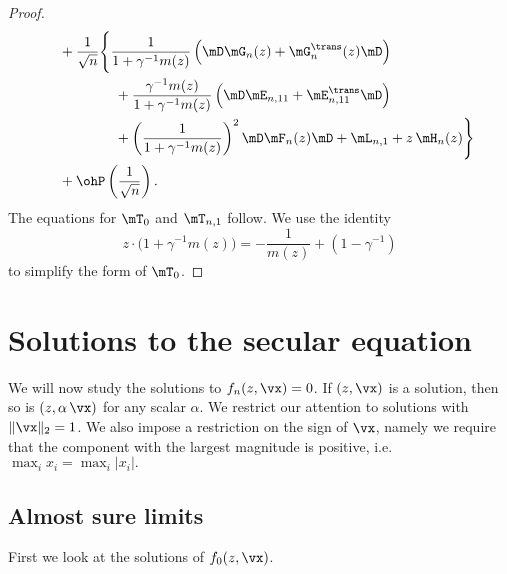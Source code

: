 \begin{proof}
\[\begin{split}
                &\quad+
                \frac{1}{\sqrt{n}} \Bigg\{
                    \frac{1}{1 + \gamma^{-1} m(z)}
                        \left( 
                            \mD \mG_n(z) 
                            + \mG_n^\trans(z) \mD 
                        \right) \\
                    &\quad\qquad\qquad+
                    \frac{\gamma^{-1} m(z)}{1 + \gamma^{-1} m(z)}
                    \left( \mD \mE_{n,11} + \mE_{n,11}^\trans \mD \right) \\
                    &\quad\qquad\qquad+
                    \left(
                        \frac{1}{1 + \gamma^{-1} m(z)}
                    \right)^2
                    \mD \mF_n(z) \mD
                    +
                    \mL_{n,1}
                    +
                    z \, \mH_n( z ) \Bigg\} \\
                &\quad+
                \ohP\left( \frac{1}{\sqrt{n}} \right).
        \end{split}
    \]
    The equations for $\mT_0$ and $\mT_{n,1}$ follow.  We use the identity
    \[
        z
        \cdot
        \Big(
            1
            +
            \gamma^{-1} m(z)
        \Big)
        =
        -
        \frac{1}{m(z)}
        +
        (1 - \gamma^{-1})
    \]
    to simplify the form of $\mT_0$.
\end{proof}

\section{Solutions to the secular equation}

We will now study the solutions to $f_{n}(z, \vx) = 0$.  If $(z, \vx)$
is a solution, then so is $(z, \alpha \, \vx)$ for any scalar $\alpha$.  We restrict our attention to solutions with $\|\vx \|_2 = 1$.  We also impose a restriction on the sign of $\vx$, namely we require that the component with the largest magnitude is positive, i.e.
\(
    \max_i x_i = \max_i | x_i |.
\)

\subsection{Almost sure limits}

First we look at the solutions of $f_0(z, \vx)$.  

